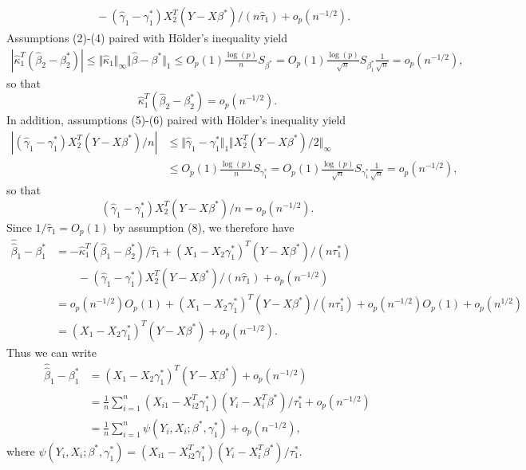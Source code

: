 \documentclass[12pt]{article}
\begin{document}
\begin{enumerate}
\begin{align*}
&\qquad- (\hat{\gamma}_1 - \gamma^*_1) X_2^T (Y - X\beta^*) / (n\hat{\tau}_1) + o_p(n^{-1/2}).
\end{align*}
Assumptions (2)-(4) paired with H\"older's inequality yield
\begin{align*}
|\hat{\kappa}_1^T(\hat{\beta}_2 - \beta^*_2)| \leq \Vert \hat{\kappa}_1 \Vert_\infty \Vert \hat{\beta} - \beta^* \Vert_1 \leq O_p(1) \frac{\log(p)}{n} S_{\beta^*} = O_p(1) \frac{\log(p)}{\sqrt{n}} S_{\beta^*_1} \frac{1}{\sqrt{n}} = o_p(n^{-1/2}),
\end{align*}
so that
\begin{equation*}
\hat{\kappa}_1^T(\hat{\beta}_2 - \beta^*_2) = o_p(n^{-1/2}).
\end{equation*}
In addition, assumptions (5)-(6) paired with H\"older's inequality yield
\begin{align*}
|(\hat{\gamma}_1 - \gamma^*_1)X_2^T(Y - X\beta^*)/n| &\leq \Vert \hat{\gamma}_1 - \gamma^*_1 \Vert_1 \Vert X_2^T(Y - X\beta^*)/2 \Vert_\infty \\
&\leq O_p(1) \frac{\log(p)}{n} S_{\gamma^*_1} = O_p(1) \frac{\log(p)}{\sqrt{n}} S_{\gamma^*_1} \frac{1}{\sqrt{n}} = o_p(n^{-1/2}),
\end{align*}
so that
\begin{equation*}
(\hat{\gamma}_1 - \gamma^*_1)X_2^T(Y - X\beta^*)/n = o_p(n^{-1/2}).
\end{equation*}
Since $1 / \hat{\tau}_1 = O_p(1)$ by assumption (8), we therefore have
\begin{align*}
\hat{\hat{\beta}}_1 - \beta^*_1 &= -\hat{\kappa}_1^T (\hat{\beta}_1 - \beta^*_2) / \hat{\tau}_1 + (X_1 - X_2\gamma^*_1)^T (Y - X\beta^*) / (n\tau^*_1) \\
&\qquad- (\hat{\gamma}_1 - \gamma^*_1) X_2^T (Y - X\beta^*) / (n\hat{\tau}_1) + o_p(n^{-1/2}) \\
&= o_p(n^{-1/2})O_p(1) + (X_1 - X_2\gamma^*_1)^T (Y - X\beta^*) / (n\tau^*_1) + o_p(n^{-1/2})O_p(1) + o_p(n^{1/2}) \\
&= (X_1 - X_2\gamma^*_1)^T (Y - X\beta^*) + o_p(n^{-1/2}).
\end{align*}
Thus we can write
\begin{align*}
\hat{\hat{\beta}}_1 - \beta^*_1 &= (X_1 - X_2\gamma^*_1)^T (Y - X\beta^*) + o_p(n^{-1/2}) \\
&= \frac{1}{n} \sum_{i=1}^n (X_{i1} - X_{i2}^T\gamma^*_1)(Y_i - X_i^T\beta^*) / \tau^*_1 + o_p(n^{-1/2}) \\
&= \frac{1}{n} \sum_{i=1}^n \psi(Y_i, X_i; \beta^*, \gamma^*_1) + o_p(n^{-1/2}),
\end{align*}
where $\psi(Y_i, X_i; \beta^*, \gamma^*_1) = (X_{i1} - X_{i2}^T\gamma^*_1)(Y_i - X_i^T\beta^*) / \tau^*_1$.


\end{enumerate}
\end{document}
